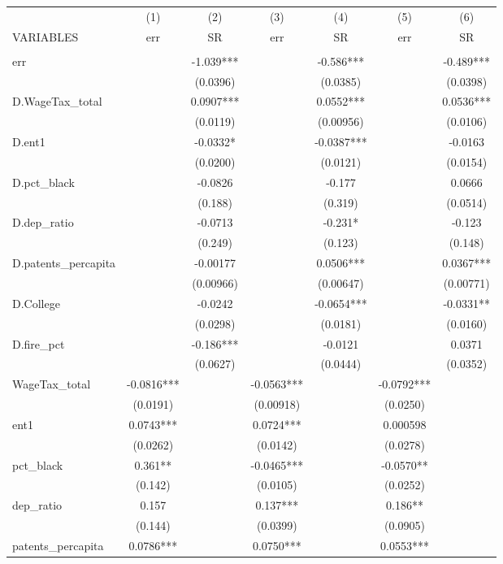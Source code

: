 \begin{tabular}{lcccccc} \hline
 & (1) & (2) & (3) & (4) & (5) & (6) \\
VARIABLES & err & SR & err & SR & err & SR \\ \hline
 &  &  &  &  &  &  \\
err &  & -1.039*** &  & -0.586*** &  & -0.489*** \\
 &  & (0.0396) &  & (0.0385) &  & (0.0398) \\
D.WageTax\_total &  & 0.0907*** &  & 0.0552*** &  & 0.0536*** \\
 &  & (0.0119) &  & (0.00956) &  & (0.0106) \\
D.ent1 &  & -0.0332* &  & -0.0387*** &  & -0.0163 \\
 &  & (0.0200) &  & (0.0121) &  & (0.0154) \\
D.pct\_black &  & -0.0826 &  & -0.177 &  & 0.0666 \\
 &  & (0.188) &  & (0.319) &  & (0.0514) \\
D.dep\_ratio &  & -0.0713 &  & -0.231* &  & -0.123 \\
 &  & (0.249) &  & (0.123) &  & (0.148) \\
D.patents\_percapita &  & -0.00177 &  & 0.0506*** &  & 0.0367*** \\
 &  & (0.00966) &  & (0.00647) &  & (0.00771) \\
D.College &  & -0.0242 &  & -0.0654*** &  & -0.0331** \\
 &  & (0.0298) &  & (0.0181) &  & (0.0160) \\
D.fire\_pct &  & -0.186*** &  & -0.0121 &  & 0.0371 \\
 &  & (0.0627) &  & (0.0444) &  & (0.0352) \\
WageTax\_total & -0.0816*** &  & -0.0563*** &  & -0.0792*** &  \\
 & (0.0191) &  & (0.00918) &  & (0.0250) &  \\
ent1 & 0.0743*** &  & 0.0724*** &  & 0.000598 &  \\
 & (0.0262) &  & (0.0142) &  & (0.0278) &  \\
pct\_black & 0.361** &  & -0.0465*** &  & -0.0570** &  \\
 & (0.142) &  & (0.0105) &  & (0.0252) &  \\
dep\_ratio & 0.157 &  & 0.137*** &  & 0.186** &  \\
 & (0.144) &  & (0.0399) &  & (0.0905) &  \\
patents\_percapita & 0.0786*** &  & 0.0750*** &  & 0.0553*** &  \\

\end{tabular}

